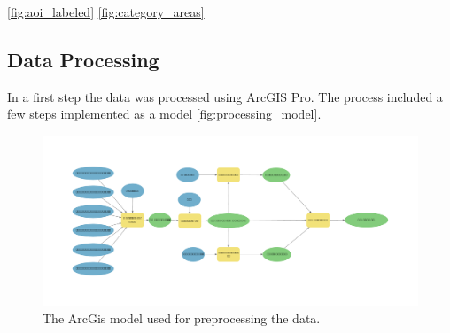 \autoref{fig:aoi_labeled}
\autoref{fig:category_areas}

\subsection{Data Processing}%

In a first step the data was processed using ArcGIS Pro. The process included a few steps implemented as
a model \autoref{fig:processing_model}.

\begin{figure}
    \centering
    \captionsetup{width=0.8\linewidth}
    \includegraphics[width=\linewidth]{figures/Model.pdf}
    \caption{The ArcGis model used for preprocessing the data.}
    \label{fig:processing_model}
\end{figure}